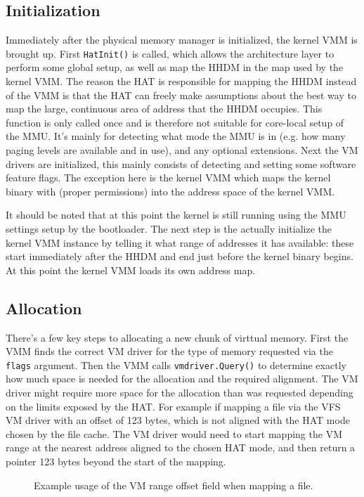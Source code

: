 \subsection{Initialization}
Immediately after the physical memory manager is initialized, the kernel VMM is brought up. First \verb|HatInit()| is called, which allows the architecture layer to perform some global setup, as well as map the HHDM in the map used by the kernel VMM. The reason the HAT is responsible for mapping the HHDM instead of the VMM is that the HAT can freely make assumptions about the best way to map the large, continuous area of address that the HHDM occupies. This function is only called once and is therefore not suitable for core-local setup of the MMU. It's mainly for detecting what mode the MMU is in (e.g. how many paging levels are available and in use), and any optional extensions. Next the VM drivers are initialized, this mainly consists of detecting and setting some software feature flags. The exception here is the kernel VMM which maps the kernel binary with (proper permissions) into the address space of the kernel VMM.

It should be noted that at this point the kernel is still running using the MMU settings setup by the bootloader. The next step is the actually initialize the kernel VMM instance by telling it what range of addresses it has available: these start immediately after the HHDM and end just before the kernel binary begins. At this point the kernel VMM loads its own address map.

\subsection{Allocation}
There's a few key steps to allocating a new chunk of virttual memory. First the VMM finds the correct VM driver for the type of memory requested via the \verb|flags| argument. Then the VMM calls \verb|vmdriver.Query()| to determine exactly how much space is needed for the allocation and the required alignment. The VM driver might require more space for the allocation than was requested depending on the limits exposed by the HAT. For example if mapping a file via the VFS VM driver with an offset of 123 bytes, which is not aligned with the HAT mode chosen by the file cache. The VM driver would need to start mapping the VM range at the nearest address aligned to the chosen HAT mode, and then return a pointer 123 bytes beyond the start of the mapping.

\begin{figure}[h]
\centering
\caption{Example usage of the VM range offset field when mapping a file.}
\end{figure}

